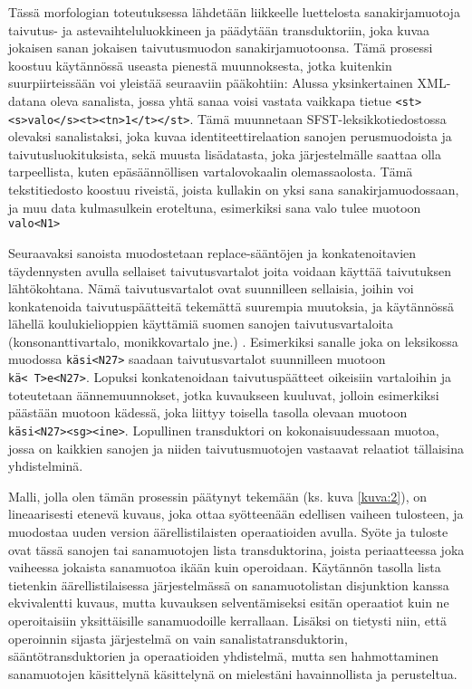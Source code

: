 \documentclass[free]{flammie}
\begin{document}
Tässä morfologian toteutuksessa lähdetään liikkeelle luettelosta
sanakirjamuotoja taivutus- ja astevaihteluluokkineen ja päädytään
transduktoriin, joka kuvaa jokaisen sanan jokaisen taivutusmuodon
sanakirjamuotoonsa. Tämä prosessi koostuu käytännössä useasta pienestä
muunnoksesta, jotka kuitenkin suurpiirteissään voi yleistää seuraaviin
pääkohtiin: Alussa yksinkertainen XML-datana oleva sanalista, jossa yhtä sanaa
voisi vastata vaikkapa tietue \texttt{<st><s>valo</s><t><tn>1</t></st>}. Tämä
muunnetaan SFST-leksikkotiedostossa olevaksi sanalistaksi, joka kuvaa identiteettirelaation sanojen
perusmuodoista ja taivutusluokituksista, sekä muusta lisädatasta, joka järjestelmälle saattaa olla tarpeellista, kuten epäsäännöllisen vartalovokaalin olemassaolosta. Tämä tekstitiedosto koostuu riveistä, joista kullakin on yksi sana sanakirjamuodossaan, ja muu data kulmasulkein eroteltuna, esimerkiksi sana valo tulee
muotoon \texttt{valo<N1>}

Seuraavaksi sanoista muodostetaan replace-sääntöjen ja konkatenoitavien täydennysten avulla sellaiset taivutusvartalot joita voidaan käyttää taivutuksen lähtökohtana. Nämä taivutusvartalot ovat suunnilleen sellaisia, joihin voi konkatenoida
taivutuspäätteitä tekemättä suurempia muutoksia, ja käytännössä lähellä
koulukielioppien käyttämiä suomen sanojen taivutusvartaloita
(konsonanttivartalo, monikkovartalo jne.) \cite{setala1930suomen}. Esimerkiksi sanalle
joka on leksikossa muodossa \texttt{käsi<N27>} saadaan taivutusvartalot
suunnilleen muotoon \texttt{kä<~T>e<N27>}.
Lopuksi konkatenoidaan taivutuspäätteet oikeisiin vartaloihin ja toteutetaan äännemuunnokset, jotka kuvaukseen kuuluvat, jolloin esimerkiksi päästään muotoon
kädessä, joka liittyy toisella tasolla olevaan muotoon
\texttt{käsi<N27><sg><ine>}.
Lopullinen transduktori on kokonaisuudessaan muotoa, jossa on kaikkien sanojen
ja niiden taivutusmuotojen vastaavat relaatiot tällaisina yhdistelminä.

Malli, jolla olen tämän prosessin päätynyt tekemään (ks. kuva \ref{kuva:2}), on lineaarisesti
etenevä kuvaus, joka ottaa syötteenään edellisen vaiheen tulosteen, ja muodostaa uuden version äärellistilaisten operaatioiden avulla. Syöte ja tuloste ovat tässä
sanojen tai sanamuotojen lista transduktorina, joista periaatteessa joka vaiheessa
jokaista sanamuotoa ikään kuin operoidaan. Käytännön tasolla lista tietenkin äärellistilaisessa järjestelmässä on sanamuotolistan disjunktion kanssa ekvivalentti
kuvaus, mutta kuvauksen selventämiseksi esitän operaatiot kuin ne operoitaisiin
yksittäisille sanamuodoille kerrallaan. Lisäksi on tietysti niin, että operoinnin sijasta järjestelmä on vain sanalistatransduktorin, sääntötransduktorien ja operaatioiden yhdistelmä, mutta sen hahmottaminen sanamuotojen käsittelynä käsittelynä on mielestäni havainnollista ja perusteltua.
\end{document}
